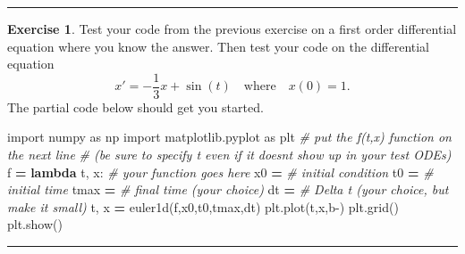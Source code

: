 \documentclass[
]{book}
\newenvironment{Shaded}{\begin{snugshade}}{\end{snugshade}}
\newcommand{\CommentTok}[1]{\textcolor[rgb]{0.56,0.35,0.01}{\textit{#1}}}
\newcommand{\ImportTok}[1]{#1}
\newcommand{\KeywordTok}[1]{\textcolor[rgb]{0.13,0.29,0.53}{\textbf{#1}}}
\newcommand{\NormalTok}[1]{#1}
\newcommand{\OperatorTok}[1]{\textcolor[rgb]{0.81,0.36,0.00}{\textbf{#1}}}
\newcommand{\StringTok}[1]{\textcolor[rgb]{0.31,0.60,0.02}{#1}}
\theoremstyle{definition}
\theoremstyle{definition}
\theoremstyle{definition}
\newtheorem{exercise}{Exercise}[chapter]
\theoremstyle{remark}
\begin{document}
\begin{center}\rule{0.5\linewidth}{0.5pt}\end{center}

\begin{exercise}
\protect\hypertarget{exr:unnamed-chunk-427}{}{\label{exr:unnamed-chunk-427} }Test your code from the previous exercise on a first order differential equation where you know the answer. Then test your code on the differential equation
\[x' = -\frac{1}{3}x+\sin(t) \quad \text{where} \quad x(0) = 1.\]
The partial code below should get you started.
\end{exercise}

\begin{Shaded}
\begin{Highlighting}[]
\ImportTok{import}\NormalTok{ numpy }\ImportTok{as}\NormalTok{ np}
\ImportTok{import}\NormalTok{ matplotlib.pyplot }\ImportTok{as}\NormalTok{ plt}
\CommentTok{\# put the f(t,x) function on the next line }
\CommentTok{\# (be sure to specify t even if it doesn\textquotesingle{}t show up in your test ODEs)}
\NormalTok{f }\OperatorTok{=} \KeywordTok{lambda}\NormalTok{ t, x: }\CommentTok{\# your function goes here}
\NormalTok{x0 }\OperatorTok{=} \CommentTok{\# initial condition}
\NormalTok{t0 }\OperatorTok{=} \CommentTok{\# initial time}
\NormalTok{tmax }\OperatorTok{=} \CommentTok{\# final time (your choice)}
\NormalTok{dt }\OperatorTok{=} \CommentTok{\# Delta t (your choice, but make it small)}
\NormalTok{t, x }\OperatorTok{=}\NormalTok{ euler1d(f,x0,t0,tmax,dt)}
\NormalTok{plt.plot(t,x,}\StringTok{\textquotesingle{}b{-}\textquotesingle{}}\NormalTok{)}
\NormalTok{plt.grid()}
\NormalTok{plt.show()}
\end{Highlighting}
\end{Shaded}

\begin{center}\rule{0.5\linewidth}{0.5pt}\end{center}
\end{document}
